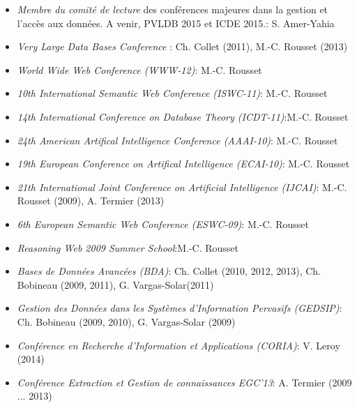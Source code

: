 \begin{itemize}
\item {\it Membre du comit\'e de lecture} des conf\'erences majeures dans la gestion et l'acc\`es aux donn\'ees. A venir, PVLDB 2015 et
  ICDE 2015.:  S. Amer-Yahia

\item {\it Very Large Data Bases Conference }: Ch. Collet (2011), M.-C. Rousset (2013)

\item {\it World Wide Web Conference (WWW-12)}: M.-C. Rousset

\item {\it 10th International Semantic Web Conference (ISWC-11)}: M.-C. Rousset

\item {\it 14th International Conference on Database Theory (ICDT-11)}:M.-C. Rousset

\item {\it 24th American Artifical Intelligence Conference (AAAI-10)}: M.-C. Rousset

\item {\it 19th European Conference on Artifical Intelligence (ECAI-10)}: M.-C. Rousset

\item {\it 21th International Joint Conference on Artificial Intelligence (IJCAI)}: M.-C. Rousset (2009), A. Termier (2013)

\item {\it 6th European Semantic Web Conference (ESWC-09)}: M.-C. Rousset

\item {\it Reasoning Web 2009 Summer School}:M.-C. Rousset 

\item {\it Bases de Donn{\'e}es Avanc{\'e}es (BDA)}:  Ch. Collet (2010, 2012, 2013), Ch. Bobineau (2009, 2011), G. Vargas-Solar(2011)

\item {\it Gestion des Donn{\'e}es dans les Syst{\`e}mes d'Information Pervasifs (GEDSIP)}: Ch. Bobineau (2009, 2010), G. Vargas-Solar (2009)

\item {\it Conf{\'e}rence en Recherche d'Information et Applications (CORIA)}: V. Leroy (2014)

\item {\it Conf{\'e}rence Extraction et Gestion de connaissances EGC'13}:  A. Termier (2009 ... 2013) 
\end{itemize}

